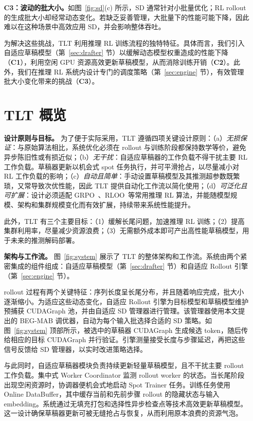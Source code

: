 \documentclass[10pt,twocolumn]{article}
\newcommand{\SysName}{\textrm{TLT}\xspace}
\begin{document}
\textbf{C3：波动的批大小。}如图~\ref{fig:sd}(c) 所示，SD 通常针对小批量优化；RL rollout 的生成批大小却经常动态变化。若缺乏妥善管理，大批量下的性能可能下降，因此难以在这种场景中高效应用 SD，并会影响整体吞吐。

为解决这些挑战，\SysName 利用推理 RL 训练流程的独特特征。具体而言，我们引入自适应草稿模型（第~\ref{sec:drafter} 节）以缓解动态模型权重造成的性能下降（\textbf{C1}），利用空闲 GPU 资源高效更新草稿模型，从而消除训练开销（\textbf{C2}）。此外，我们在推理 RL 系统内设计专门的调度策略（第~\ref{sec:engine} 节），有效管理批大小变化带来的挑战（\textbf{C3}）。

\section{\SysName 概览}
\label{sec:overview}

\noindent\textbf{设计原则与目标。}
为了便于实际采用，\SysName 遵循四项关键设计原则：（a）\emph{无损保证}：与原始算法相比，系统优化必须在 rollout 与训练阶段都保持数学等价，避免异步陈旧性或有损近似；（b）\emph{无干扰}：自适应草稿器的工作负载不得干扰主要 RL 工作负载。草稿器更新以机会式 spot 任务执行，并可平滑抢占，以尽量减小对 RL 工作负载的影响；（c）\emph{自动且简单}：手动设置草稿模型及其推测超参数既繁琐，又常导致次优性能，因此 \SysName 提供自动化工作流以简化使用；（d）\emph{可泛化且可扩展}：设计必须适配 GRPO~\cite{DeepSeekMath}、RLOO~\cite{RLOO}等常用推理 RL 算法，并能随模型规模、架构和集群规模变化而有效扩展，持续带来系统性能提升。

此外，\SysName 有三个主要目标：（1）缓解长尾问题，加速推理 RL 训练；（2）提高集群利用率，尽量减少资源浪费；（3）无需额外成本即可产出高性能草稿模型，用于未来的推测解码部署。

\noindent\textbf{架构与工作流。}
图~\ref{fig:system} 展示了 \SysName 的整体架构和工作流。系统由两个紧密集成的组件组成：自适应草稿模型（第~\ref{sec:drafter} 节）和自适应 Rollout 引擎（第~\ref{sec:engine} 节）。

rollout 过程有两个关键特征：序列长度呈长尾分布，并且随着响应完成，批大小逐渐缩小。为适应这些动态变化，自适应 Rollout 引擎为目标模型和草稿模型维护预捕获 CUDAGraph 池，并由自适应 SD 管理器进行管理。该管理器使用本文提出的 BEG-MAB 调优器，自动为每个输入批选择合适的 SD 策略。如图~\ref{fig:system} 顶部所示，被选中的草稿器 CUDAGraph 生成候选 token，随后传给相应的目标 CUDAGraph 并行验证。引擎测量接受长度与步骤延迟，再把这些信号反馈给 SD 管理器，以实时改进策略选择。

与此同时，自适应草稿器模块负责持续更新轻量草稿模型，且不干扰主要 rollout 工作负载。集中式 Worker Coordinator 监测 rollout worker 的状态。当长尾阶段出现空闲资源时，协调器便机会式地启动 Spot Trainer 任务。训练任务使用 Online DataBuffer，其中缓存当前和先前步骤 rollout 的隐藏状态与输入 embedding。系统通过无填充打包和选择性异步检查点等技术高效更新草稿模型。这一设计确保草稿器更新可被无缝抢占与恢复，从而利用原本浪费的资源气泡。
\end{document}
